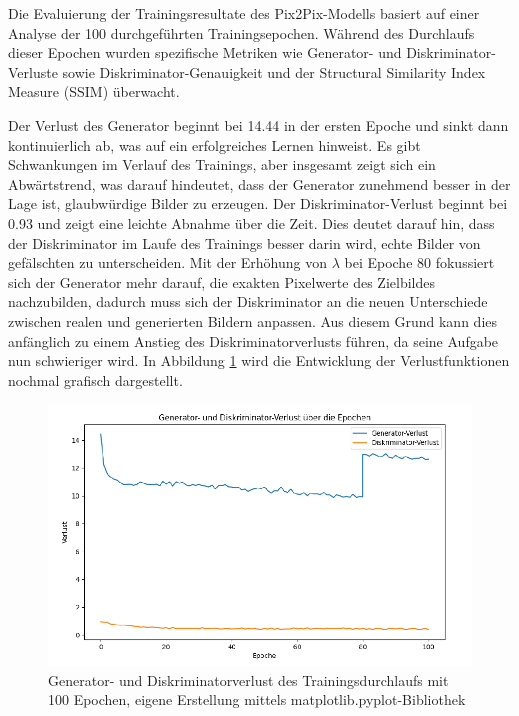Die Evaluierung der Trainingsresultate des Pix2Pix-Modells basiert auf einer Analyse der 100 durchgeführten Trainingsepochen. Während des Durchlaufs dieser Epochen wurden spezifische Metriken wie Generator- und Diskriminator-Verluste sowie Diskriminator-Genauigkeit und der Structural Similarity Index Measure (SSIM) überwacht.\newline

Der Verlust des Generator beginnt bei 14.44 in der ersten Epoche und sinkt dann kontinuierlich ab, was auf ein erfolgreiches Lernen hinweist. Es gibt Schwankungen im Verlauf des Trainings, aber insgesamt zeigt sich ein Abwärtstrend, was darauf hindeutet, dass der Generator zunehmend besser in der Lage ist, glaubwürdige Bilder zu erzeugen.\newline
Der Diskriminator-Verlust beginnt bei 0.93 und zeigt eine leichte Abnahme über die Zeit. Dies deutet darauf hin, dass der Diskriminator im Laufe des Trainings besser darin wird, echte Bilder von gefälschten zu unterscheiden. Mit der Erhöhung von $\lambda$ bei Epoche 80 fokussiert sich der Generator mehr darauf, die exakten Pixelwerte des Zielbildes nachzubilden, dadurch muss sich der Diskriminator an die neuen Unterschiede zwischen realen und generierten Bildern anpassen. Aus diesem Grund kann dies anfänglich zu einem Anstieg des Diskriminatorverlusts führen, da seine Aufgabe nun schwieriger wird. In Abbildung \ref{fig:Verlustkurve 0-100} wird die Entwicklung der Verlustfunktionen nochmal grafisch dargestellt.
\begin{figure}[h]
	\centering
	\includegraphics[width=1.0\textwidth]{images/Pix2PixResults/Verlust0-100.png}
	\caption{Generator- und Diskriminatorverlust des Trainingsdurchlaufs mit 100 Epochen, eigene Erstellung mittels matplotlib.pyplot-Bibliothek }
	\label{fig:Verlustkurve 0-100}
\end{figure}
 \newpage

